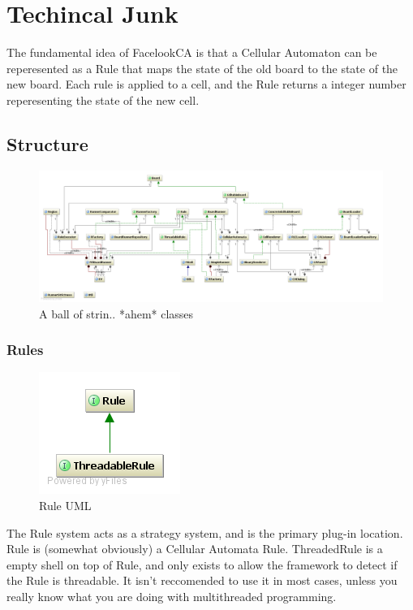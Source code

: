 \documentclass{report}
\begin{document}
\chapter{Techincal Junk}
The fundamental idea of FacelookCA is that a Cellular Automaton can be
reperesented as a Rule that maps the state of the old board to the state of the
new board. Each rule is applied to a cell, and the Rule returns a integer number
reperesenting the state of the new cell.
\section{Structure}
\begin{figure}[H]
\includegraphics[scale=.2]{FacelookCA}
\caption{A ball of strin.. *ahem* classes}
\label{uml:mess}
\end{figure}
\subsection{Rules}
\begin{figure}[H]
\includegraphics[scale=.4]{RuleCD}
\caption{Rule UML}
\label{UML:rule}
\end{figure}
The Rule system acts as a strategy system, and is the primary plug-in
location. Rule is (somewhat obviously) a Cellular Automata Rule. ThreadedRule is
a empty shell on top of Rule, and only exists to allow the framework to detect
if the Rule is threadable. It isn't reccomended to use it in most cases, unless
you really know what you are doing with multithreaded programming.
\end{document}
